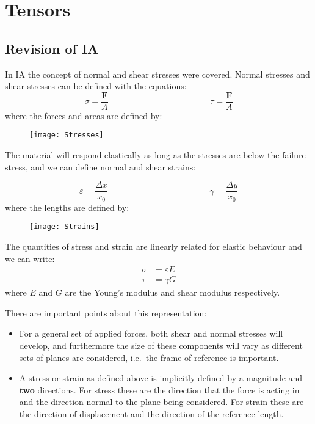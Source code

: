 \section{Tensors}
\subsection{Revision of IA}

In IA the concept of normal and shear stresses were covered. Normal stresses and shear stresses can be defined with the equations:
\begin{equation*}
\sigma = \frac{\mathbf{F}}{A} \hspace{5cm}  \tau = \frac{\mathbf{F}}{A}
\end{equation*}
where the forces and areas are defined by:
\begin{figure}[h!]
\centering
\texttt{[image: Stresses]}
\end{figure}

The material will respond elastically as long as the stresses are below the failure stress, and we can define normal and shear strains:

\begin{equation*}
\varepsilon = \frac{\Delta x}{x_0} \hspace{5cm} \gamma = \frac{\Delta y}{x_0}
\end{equation*}
where the lengths are defined by:
\begin{figure}[h!]
\centering
\texttt{[image: Strains]}
\end{figure}

The quantities of stress and strain are linearly related for elastic behaviour and we can write:
\begin{align}
\sigma &= \varepsilon E \nonumber\\
\tau &= \gamma G \label{eqn:def_moduli}
\end{align}
where $E$ and $G$ are the Young's modulus and shear modulus respectively.

There are important points about this representation:
\begin{itemize}
\item For a general set of applied forces, both shear and normal stresses will develop, and furthermore the size of these components will vary as different sets of planes are considered, i.e.\ the frame of reference is important.
\item A stress or strain as defined above is implicitly defined by a magnitude and {\bf{two}} directions. For stress these are the direction that the force is acting in and the direction normal to the plane being considered. For strain these are the direction of displacement and the direction of the reference length.
\end{itemize}

